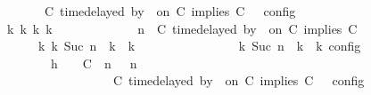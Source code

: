 \begin{isabellebody}
\ \ \ \ \ \ \ \ \ \ \ \ \ \ {\isasymturnstile}\ {\isasymPsi}\ {\isasymtriangleright}\ {\isacharparenleft}{\isacharparenleft}C\ time{\isacharminus}delayed{\isasymbowtie}\ by\ {\isasymdelta}{\isasymtau}\ on\ C\ implies\ C\ {\isacharhash}\ {\isasymPhi}{\isacharparenright}\ {\isasymrbrakk}\isactrlsub c\isactrlsub o\isactrlsub n\isactrlsub f\isactrlsub i\isactrlsub g\isanewline
\ \ \ \ \ \ \ \ \ \ {\isasymLongrightarrow}\ {\isasymexists}{\isasymGamma}\isactrlsub k\ {\isasymPsi}\isactrlsub k\ {\isasymPhi}\isactrlsub k\ k{\isachardot}\isanewline
\ \ \ \ \ \ \ \ \ \ \ \ {\isacharparenleft}{\isacharparenleft}{\isasymGamma}{\isacharcomma}\ n\ {\isasymturnstile}\ {\isacharparenleft}{\isacharparenleft}C\ time{\isacharminus}delayed{\isasymbowtie}\ by\ {\isasymdelta}{\isasymtau}\ on\ C\ implies\ C\ {\isacharhash}\ {\isasymPsi}{\isacharparenright}\ {\isasymtriangleright}\ {\isasymPhi}{\isacharparenright}\isanewline
\ \ \ \ \ \ \ \ \ \ \ \ \ \ \ \ {\isasymhookrightarrow}\isactrlbsup k\isactrlesup \ {\isacharparenleft}{\isasymGamma}\isactrlsub k{\isacharcomma}\ Suc\ n\ {\isasymturnstile}\ {\isasymPsi}\isactrlsub k\ {\isasymtriangleright}\ {\isasymPhi}\isactrlsub k{\isacharparenright}{\isacharparenright}\isanewline
\ \ \ \ \ \ \ \ \ \ \ \ {\isasymand}\ {\isasymrho}\ {\isasymin}\ {\isasymlbrakk}\ {\isasymGamma}\isactrlsub k{\isacharcomma}\ Suc\ n\ {\isasymturnstile}\ {\isasymPsi}\isactrlsub k\ {\isasymtriangleright}\ {\isasymPhi}\isactrlsub k\ {\isasymrbrakk}\isactrlsub c\isactrlsub o\isactrlsub n\isactrlsub f\isactrlsub i\isactrlsub g{\isacartoucheclose}\isanewline
\ \ \ \ \ \ \isamarkupfalse%
\ {\isacharminus}\isanewline
\ \ \ \ \ \ \ \ \isamarkupfalse%
\ h{}{\isacharcolon}\ {\isacartoucheopen}{\isasymrho}\ {\isasymin}\ {\isasymlbrakk}\ {\isacharparenleft}{\isacharparenleft}C\ {\isasymnot}{\isasymUp}\ n{\isacharparenright}\ {\isacharhash}\ {\isasymGamma}{\isacharparenright}{\isacharcomma}\ n\isanewline
\ \ \ \ \ \ \ \ \ \ \ \ \ \ \ \ \ \ \ \ \ \ \ \ \ {\isasymturnstile}\ {\isasymPsi}\ {\isasymtriangleright}\ {\isacharparenleft}{\isacharparenleft}C\ time{\isacharminus}delayed{\isasymbowtie}\ by\ {\isasymdelta}{\isasymtau}\ on\ C\ implies\ C\ {\isacharhash}\ {\isasymPhi}{\isacharparenright}\ {\isasymrbrakk}\isactrlsub c\isactrlsub o\isactrlsub n\isactrlsub f\isactrlsub i\isactrlsub g{\isacartoucheclose}\isanewline

\end{isabellebody}
